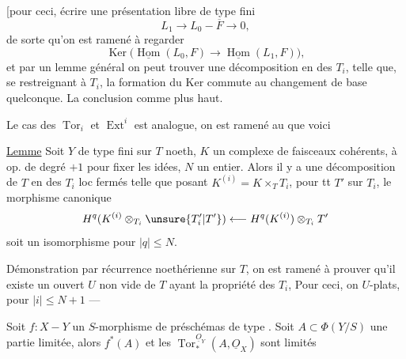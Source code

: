[pour ceci, écrire une  présentation libre de type fini
\[
L_1\longrightarrow L_0-\overline F\longrightarrow0,
\]
de sorte qu'on est ramené à regarder
\[
\operatorname{Ker}\bigl(\underline{\operatorname{Hom}}(L_0,F)\longrightarrow\underline{\operatorname{Hom}}(L_1,F)\bigr),
\]
et par un lemme général on peut trouver une décomposition  en des $T_i$, telle que, se restreignant à $T_i$, la formation du Ker commute au changement de base quelconque. La conclusion comme plus haut.


Le cas des $\operatorname{Tor}_i$ et $\operatorname{Ext}^i$ est analogue, on est ramené au  que voici

\uline{Lemme} Soit $Y$ de type fini sur $T$ noeth, $K$ un complexe de faisceaux cohérents, à op. de degré $+1$ pour fixer les idées, $N$ un entier. Alors il y a une décomposition de $T$ en des $T_i$ loc fermés  telle que
 posant $K^{(i)}=K\times_T T_i$, pour tt $T'$ sur $T_i$, le morphisme canonique
\[
H^q(K^{(i)}\otimes_{T_i}\unsure{T'_i|T'})\longleftarrow H^q(K^{(i)})\otimes_{T_i}T'
\]
soit un isomorphisme pour $|q|\leq N$.

Démonstration par récurrence noethérienne sur $T$, on est ramené à prouver qu'il existe un ouvert $U$ non vide de $T$ ayant la propriété des $T_i$,  Pour ceci, on      $U$-plats, pour $|i|\leq N+1$ ---


Soit $f:X-Y$ un $S$-morphisme de préschémas de type . Soit $A\subset\Phi(Y/S)$ une partie limitée, alors $f^*(A)$ et les $\operatorname{Tor}^{\underline O_Y}_{*}(A,\underline O_X)$ sont limités

